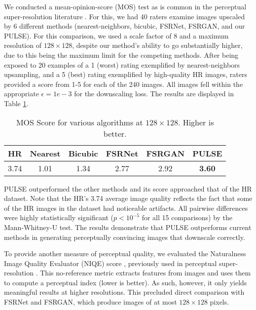 \documentclass[10pt,twocolumn,letterpaper]{article}
\begin{document}
We conducted a mean-opinion-score (MOS) test as is common in the perceptual super-resolution literature \cite{SRGAN,kim2019progressive}. For this, we had 40 raters examine images upscaled by 6 different methods (nearest-neighbors, bicubic, FSRNet, FSRGAN, and our PULSE). For this comparison, we used a scale factor of $8$ and a maximum resolution of $128 \times 128$, despite our method's ability to go substantially higher, due to this being the maximum limit for the competing methods. After being exposed to 20 examples of a 1 (worst) rating exemplified by nearest-neighbors upsampling, and a 5 (best) rating exemplified by high-quality HR images, raters provided a score from 1-5 for each of the 240 images. All images fell within the appropriate $\epsilon = 1e-3$ for the downscaling loss. The results are displayed in Table \ref{tab:MOS}. 
\begin{table}[]
\small{
\renewcommand{\arraystretch}{1.2}
\begin{tabular}{|c|c|c|c|c|c|}
\hline
HR   & Nearest & Bicubic & FSRNet & FSRGAN & PULSE \\ \hline \hline
3.74 & 1.01    & 1.34    & 2.77   & 2.92   & \textbf{3.60}  \\ \hline
\end{tabular}
}
\centering
\caption{MOS Score for various algorithms at $128 \times 128$. Higher is better.}
\label{tab:MOS}
\end{table}

PULSE outperformed the other methods and its score approached that of the HR dataset. Note that the HR's 3.74 average image quality reflects the fact that some of the HR images in the dataset had noticeable artifacts. All pairwise differences were highly statistically significant ($p < 10^{-5}$ for all 15 comparisons) by the Mann-Whitney-U test. The results demonstrate that PULSE outperforms current methods in generating perceptually convincing images that downscale correctly. 

To provide another measure of perceptual quality, we evaluated the Naturalness Image Quality Evaluator (NIQE) score \cite{NIQE}, previously used in perceptual super-resolution \cite{jeong2015multi,Blau_2018_ECCV_Workshops,esrgan}. This no-reference metric extracts features from images and uses them to compute a perceptual index (lower is better). As such, however, it only yields meaningful results at higher resolutions. This precluded direct comparison with FSRNet and FSRGAN, which produce images of at most $128 \times 128$ pixels.
\end{document}
